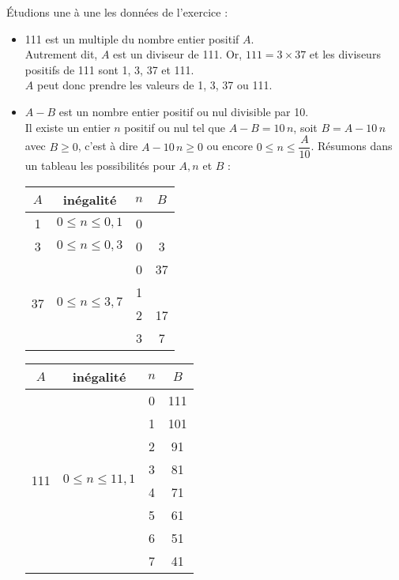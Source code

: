 Étudions une à une les données de l'exercice :
\begin{itemize}
   \item 111 est un multiple du nombre entier positif $A$. \\
   Autrement dit, $A$ est un diviseur de 111. Or, $111 =3\times37$ et les diviseurs positifs de 111 sont 1, 3, 37 et 111. \\
   $A$ peut donc prendre les valeurs de 1, 3, 37 ou 111.
   \smallskip
   \item $A-B$ est un nombre entier positif ou nul divisible par 10. \\
   Il existe un entier $n$ positif ou nul tel que $A-B =10\,n$, soit $B =A-10\,n$ avec $B\geq0$, c'est à dire $A-10\,n\geq0$ ou encore $0\leqslant n\leqslant \dfrac{A}{10}$. Résumons dans un tableau les possibilités pour $A, n$ et $B$ : \\ [1mm]
   \begin{tabular}{|C{0.8}|c|C{0.8}|C{0.8}|}
      \hline
      $A$ & inégalité & $n$ & $B$ \\
       & $0\leqslant n\leqslant 0,1$ & 0 &  \\
       & $0\leqslant n\leqslant 0,3$ & 0 & 3 \\
      \hline
       &  & 0 & 37 \\
      & & 1 &  \\
      & & 2 & 17 \\
      & & 3 & 7 \\
      \hline
   \end{tabular}
   \qquad
   \begin{tabular}{|C{0.8}|c|C{0.8}|C{0.8}|}
      \hline
      $A$ & inégalité & $n$ & $B$ \\
      \hline
       &  & 0 & 111 \\
      & & 1 & 101 \\
      & & 2 & 91 \\
      & & 3 & 81 \\
      & & 4 & 71 \\
      & & 5 & 61 \\
      & & 6 & 51 \\
      & & 7 & 41 \\

\end{tabular}
\end{itemize}
